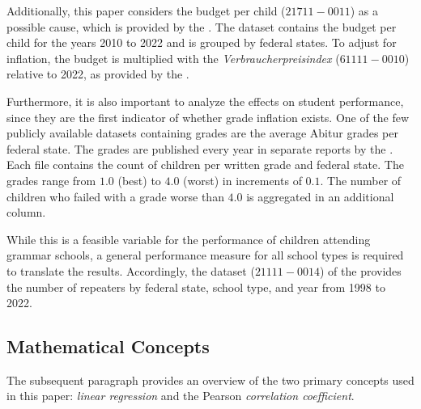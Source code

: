 Additionally, this paper considers the budget per child (\href{https://www-genesis.destatis.de/genesis//online?operation=table&code=21711-0011&bypass=true&levelindex=0&levelid=1706352648560#abreadcrumb}{$21711-0011$}) as a possible cause, which is provided  by the \citeauthor{statistische_bundesamt_statistisches_2024}. The dataset contains the budget per child for the years 2010 to 2022 and is grouped by federal states. To adjust for inflation, the budget is multiplied with the \textit{Verbraucherpreisindex} (\href{https://www-genesis.destatis.de/genesis//online?operation=table&code=61111-0010&bypass=true&levelindex=0&levelid=1706352769529#abreadcrumb}{$61111-0010$}) relative to 2022, as provided by the \citeauthor{statistische_bundesamt_statistisches_2024}. 


Furthermore, it is also important to analyze the  effects on student performance, since they are the first indicator of whether grade inflation exists. One of the few publicly available datasets containing grades are the average Abitur grades per federal state. The grades are published every year in separate reports by the \citeauthor{kultusminister_konferenz_abiturnoten_nodate}. Each file contains the count of children per written grade and federal state. The grades range from $1.0$ (best) to $4.0$ (worst) in increments of $0.1$. The number of children who failed with a grade worse than $4.0$ is aggregated in an additional column. 

While this is a feasible variable for the performance of children attending grammar schools, a general performance measure for all school types is required to translate the results. Accordingly, the dataset (\href{https://www-genesis.destatis.de/genesis//online?operation=table&code=21111-0014&bypass=true&levelindex=0&levelid=1706352887288#abreadcrumb}{$21111-0014$}) of the \citeauthor{statistische_bundesamt_statistisches_2024} provides the number of repeaters by federal state, school type, and year from 1998 to 2022.


\subsection{Mathematical Concepts}
The subsequent paragraph provides an overview of the two primary concepts used in this paper: \emph{linear regression} and the Pearson \emph{correlation coefficient}.

